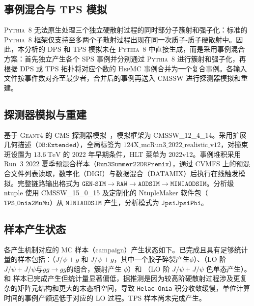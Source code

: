 \subsection{事例混合与 TPS 模拟}

\textsc{Pythia}~8 无法原生处理三个独立硬散射过程的同时部分子簇射和强子化：标准的 \textsc{Pythia}~8 框架仅支持至多两个子散射过程出现在同一次质子-质子硬散射中。因此，本分析的 DPS 和 TPS 模拟未在 \textsc{Pythia}~8 中直接生成，而是采用事例混合方案：首先独立产生各个 SPS 事例并分别通过 \textsc{Pythia}~8 进行簇射和强子化，再根据 DPS 或 TPS 拓扑将对应个数的 \textsc{HepMC} 事例合并为一个复合事例。各输入文件按事件数对齐至最少者，合并后的事例再送入 \textsc{CMSSW} 进行探测器模拟和重建。

\subsection{探测器模拟与重建}

基于 \textsc{Geant4} 的 CMS 探测器模拟~\cite{GEANT4}，模拟框架为 \textsc{CMSSW\_12\_4\_14}。采用扩展几何描述（$\texttt{DB:Extended}$），全局标签为 $124\mathrm{X}\_\mathrm{mcRun3\_2022\_realistic\_v12}$，对撞束斑设置为 $\SI{13.6}{\tera\eV}$ 的 2022 年早期条件，HLT 菜单为 2022v12。事例堆积采用 Run~3 2022 夏季预混合样本（$\texttt{Run3Summer22DRPremix}$），通过 CVMFS 上的预混合文件列表读取，数字化（DIGI）与数据混合（DATAMIX）后执行在线触发模拟。完整链路输出格式为 $\texttt{GEN-SIM} \to \texttt{RAW} \to \texttt{AODSIM} \to \texttt{MINIAODSIM}$。分析级 ntuple 使用 \textsc{CMSSW\_15\_0\_15} 及定制化的 NtupleMaker 软件包（$\texttt{TPS\_Onia2MuMu}$）从 $\texttt{MINIAODSIM}$ 产生，分析模式为 $\texttt{JpsiJpsiPhi}$。

\subsection{样本产生状态}

各产生机制对应的 MC 样本（campaign）产生状态如下。已完成且具有足够统计量的样本包括：\DPSone（$J/\psi+g$ 和 $J/\psi+g$，其中一个胶子碎裂产生$\phi$）、\DPStwoLO（LO 阶 $J/\psi+J/\psi$与$gg \to gg$的组合，簇射产生 $\phi$）和 \SPSLO（LO 阶 $J/\psi+J/\psi$ 色单态产生）。\DPStwoNLO 和 \SPSNLO 样本已完成产生但统计量显著偏低，据推测是因为较高阶硬散射过程涉及更复杂的矩阵元结构和更大的末态相空间，导致 \texttt{Helac-Onia} 积分收敛缓慢，单位计算时间的事例产额远低于对应的 LO 过程。TPS 样本尚未完成产生。

